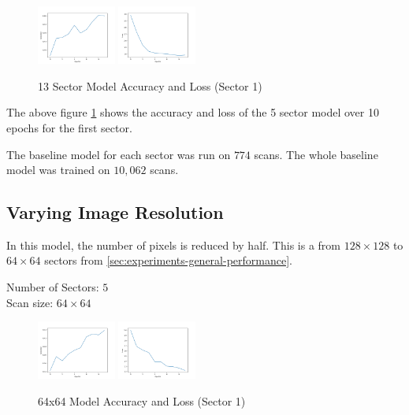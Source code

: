 \documentclass[10pt,twocolumn,letterpaper]{article}
\begin{document}
         \begin{figure}[h]
            \centering
            \includegraphics[width=0.23\textwidth]{./images/training_accuracy_13_sector_128_px.png}
            \includegraphics[width=0.23\textwidth]{./images/training_loss_13_sector_128_px.png}
            \caption{13 Sector Model Accuracy and Loss (Sector 1)}
            \label{fig:experiments-13-sector-acc-loss}
         \end{figure}

         The above figure \ref{fig:experiments-13-sector-acc-loss} shows the accuracy and loss of the 5 sector model over 10 epochs for the first sector.

         The baseline model for each sector was run on $774$ scans. The whole baseline model was trained on $10,062$ scans.
   \subsection{Varying Image Resolution} \label{sec:experiements-res}
      In this model, the number of pixels is reduced by half. This is a from $128 \times 128$ to $64 \times 64$ sectors from \ref{sec:experiments-general-performance}.
      \begin{center}
         Number of Sectors: $5$ \\
         Scan size: $64 \times 64$
      \end{center}

      \begin{figure}[h]
         \centering
         \includegraphics[width=0.23\textwidth]{./images/training_accuracy_5_sector_64_px.png}
         \includegraphics[width=0.23\textwidth]{./images/training_loss_5_sector_64_px.png}
         \caption{64x64 Model Accuracy and Loss (Sector 1)}
         \label{fig:experiments-64-px-acc-loss}
      \end{figure}
\end{document}
